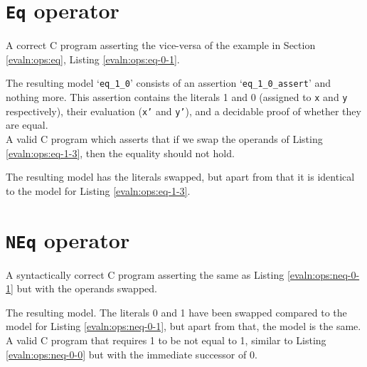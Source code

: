\section{\texttt{Eq} operator}\label{app:evaln:ops:eq}
    
    
    A correct C program asserting the vice-versa of the example in Section \ref{evaln:ops:eq}, Listing \ref{evaln:ops:eq-0-1}.
    
    The resulting model `\texttt{eq\_1\_0}' consists of an assertion `\texttt{eq\_1\_0\_assert}' and nothing more. This assertion contains the literals 1 and 0 (assigned to \texttt{x} and \texttt{y} respectively), their evaluation (\texttt{x'} and \texttt{y'}), and a decidable proof of whether they are equal.
    \\
    
    
    
    A valid C program which asserts that if we swap the operands of Listing \ref{evaln:ops:eq-1-3}, then the equality should not hold.
    
    
    The resulting model has the literals swapped, but apart from that it is identical to the model for Listing \ref{evaln:ops:eq-1-3}.
    
    
\section{\texttt{NEq} operator}\label{app:evaln:ops:neq}
    
    
    A syntactically correct C program asserting the same as Listing \ref{evaln:ops:neq-0-1} but with the operands swapped.
    
    
    The resulting \Idris model. The literals 0 and 1 have been swapped compared to the model for Listing \ref{evaln:ops:neq-0-1}, but apart from that, the model is the same.
    \\
    
    
    A valid C program that requires 1 to be not equal to 1, similar to Listing \ref{evaln:ops:neq-0-0} but with the immediate successor of 0.
    
